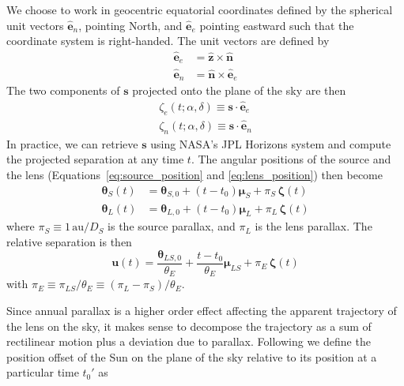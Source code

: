 \documentclass[11pt]{report}
\begin{document}
We choose to work in geocentric equatorial coordinates defined by the spherical
unit vectors $\hat{\mathbf e}_n$, pointing North, and $\hat{\mathbf e}_e$
pointing eastward such that the coordinate system is right-handed. The unit
vectors are defined by
\begin{align}
    \hat{\mathbf e}_e & = \hat{\mathbf z}\times \hat{\mathbf n}  \\
    \hat{\mathbf e}_n & = \hat{\mathbf n}\times\hat{\mathbf e}_e
\end{align}
The two components of $\mathbf s$ projected onto the plane of the sky are then
\begin{align}
    \zeta_e(t;\alpha,\delta)\equiv \mathbf s\cdot \hat{\mathbf e}_e \\
    \zeta_n(t;\alpha,\delta)\equiv \mathbf s\cdot \hat{\mathbf e}_n
\end{align}
In practice, we can retrieve $\mathbf{s}$ using NASA's JPL Horizons system and compute
the projected separation at any time $t$.
The angular positions of the source and the lens
(Equations~\ref{eq:source_position} and \ref{eq:lens_position}) then become
\begin{align}
    \boldsymbol{\theta}_S(t) & = \boldsymbol{\theta}_{S,0}+(t-t_0)\boldsymbol{\mu}_S
    +\pi_S\,\boldsymbol{\zeta}(t)                                                    \\
    \boldsymbol{\theta}_L(t) & = \boldsymbol{\theta}_{L,0}+(t-t_0)\boldsymbol{\mu}_L
    +\pi_L\,\boldsymbol{\zeta}(t)
\end{align}
where  $\pi_S\equiv 1\,\mathrm{au}/D_S$ is the source parallax, and $\pi_L$ is the
lens parallax.
The relative separation is then
\begin{equation}
    \boldsymbol{u}(t)= \frac{\boldsymbol\theta_{LS, 0}}{\theta_E}
    +\frac{t-t_0}{\theta_E}\boldsymbol{\mu}_{LS}+\pi_{E}\,\boldsymbol{\zeta}(t)
    \label{eq:relative_separation_parallax}
\end{equation}
with $\pi_E\equiv\pi_{LS}/\theta_E\equiv (\pi_L-\pi_S)/\theta_E$.

Since annual parallax is a higher order effect affecting the apparent
trajectory of the lens on the sky, it makes sense to decompose the trajectory
as a sum of rectilinear motion plus a deviation due to parallax. Following
\citet{2004ApJ...606..319G} we define the position offset of the Sun on the
plane of the sky relative to its position at a particular time $t_0'$ as
\end{document}
